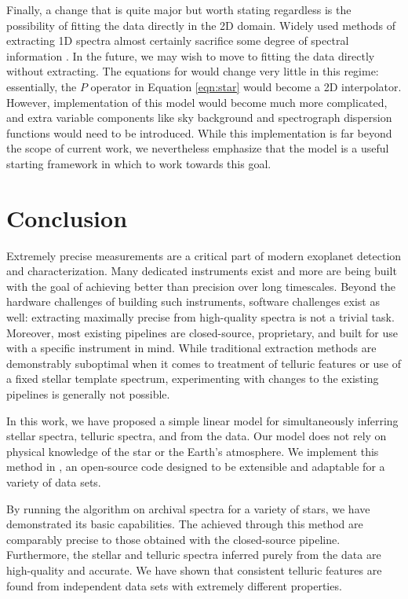 \documentclass[modern]{aastex62}
\begin{document}
Finally, a change that is quite major but worth stating regardless is the possibility of fitting the data directly in the 2D domain. 
Widely used methods of extracting 1D spectra almost certainly sacrifice some degree of spectral information \citep{Bolton2010}.
In the future, we may wish to move to fitting the data directly without extracting. 
The equations for \wobble would change very little in this regime: essentially, the $P$ operator in Equation \ref{eqn:star} would become a 2D interpolator. 
However, implementation of this model would become much more complicated, and extra variable components like sky background and spectrograph dispersion functions would need to be introduced. 
While this implementation is far beyond the scope of current work, we nevertheless emphasize that the \wobble model is a useful starting framework in which to work towards this goal.

\section{Conclusion}
\label{s:conclusion}

Extremely precise \RV measurements are a critical part of modern exoplanet detection and characterization. 
Many dedicated \EPRV instruments exist and more are being built with the goal of achieving better than \ms precision over long timescales. 
Beyond the hardware challenges of building such instruments, software challenges exist as well: extracting maximally precise \RVs from high-quality spectra is not a trivial task. 
Moreover, most existing \EPRV pipelines are closed-source, proprietary, and built for use with a specific instrument in mind. 
While traditional \RV extraction methods are demonstrably suboptimal when it comes to treatment of telluric features or use of a fixed stellar template spectrum, experimenting with changes to the existing pipelines is generally not possible.

In this work, we have proposed a simple linear model for simultaneously inferring stellar spectra, telluric spectra, and \RVs from the data. 
Our model does not rely on physical knowledge of the star or the Earth's atmosphere. 
We implement this method in \wobble, an open-source code designed to be extensible and adaptable for a variety of data sets. 

By running the \wobble algorithm on archival \HARPS spectra for a variety of stars, we have demonstrated its basic capabilities. 
The \RVs achieved through this method are comparably precise to those obtained with the closed-source \HARPS pipeline. 
Furthermore, the stellar and telluric spectra inferred purely from the data are high-quality and accurate. 
We have shown that consistent telluric features are found from independent data sets with extremely different properties. 
\end{document}
